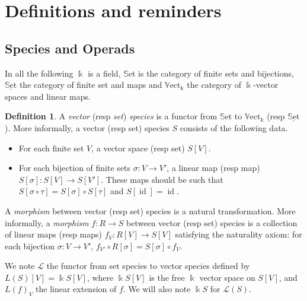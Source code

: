 \documentclass[a4paper]{article}
\DeclareMathOperator{\id}{id}
\theoremstyle{definition}
\newtheorem{definition}{Definition}
\begin{document}
\section{Definitions and reminders}

\subsection{Species and Operads}

In all the following $\Bbbk$ is a field, $\mathbb{S}$et is the category of finite sets and bijections, $\underline{\text{$\mathbb{S}$et}}$ the category of finite set and maps and $\mathbb{V}\text{ect}_{\Bbbk}$ the category of $\Bbbk$-vector spaces and linear maps.


\begin{definition}
A \textit{vector} (resp \textit{set}) \textit{species} is a functor from $\mathbb{S}$et to $\mathbb{V}\text{ect}_{\Bbbk}$ (resp $\underline{\text{$\mathbb{S}$et}}$).
More informally, a vector (resp set) species $S$ consists of the following data.
\begin{itemize}
\item For each finite set $V$, a vector space (resp set) $S[V]$.
\item For each bijection of finite sets $\sigma: V\rightarrow V'$, a linear map (resp map) $S[\sigma]:S[V]\rightarrow S[V']$. These maps should be such that $S[\sigma\circ\tau] = S[\sigma]\circ S[\tau]$ and $S[\id] = \id$.
\end{itemize}


A \textit{morphism} between vector (resp set) species is a natural transformation.
More informally, a \textit{morphism} $f: R\rightarrow S$ between vector (resp set) species is a collection of linear maps (resp maps) $f_V : R[V] \rightarrow S[V]$ satisfying the naturality axiom: for each bijection $\sigma: V\rightarrow V'$, $f_{V'}\circ R[\sigma] = S[\sigma]\circ f_V$.

We note $\mathcal{L}$ the functor from set species to vector species defined by $L(S)[V] = \Bbbk S[V]$, where $\Bbbk S[V]$ is the free $\Bbbk$ vector space on $S[V]$, and $L(f)_V$ the linear extension of $f$. We will also note $\Bbbk S$ for $\mathcal{L}(S)$.
\end{definition}
\end{document}
